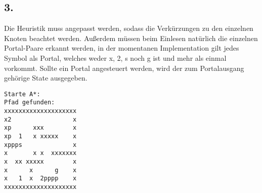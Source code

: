 \documentclass[a4paper,11pt,fleqn]{scrartcl}
\begin{document}
\subsection*{3.}
Die Heuristik muss angepasst werden, sodass die Verkürzungen zu den einzelnen Knoten beachtet werden.
Außerdem müssen beim Einlesen natürlich die einzelnen Portal-Paare erkannt werden, in der momentanen Implementation gilt jedes Symbol als Portal, welches weder x, 2, s noch g ist und mehr als einmal vorkommt. 
Sollte ein Portal angesteuert werden, wird der zum Portalausgang gehörige State ausgegeben.

\begin{verbatim}
Starte A*:
Pfad gefunden:
xxxxxxxxxxxxxxxxxxxx
x2                 x
xp      xxx        x
xp  1   x xxxxx    x
xppps              x
x       x x  xxxxxxx
x  xx xxxxx        x
x      x      g    x
x   1  x  2pppp    x
xxxxxxxxxxxxxxxxxxxx
\end{verbatim}
\end{document}
